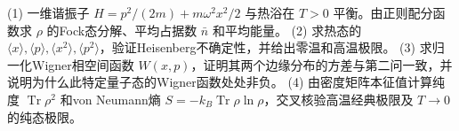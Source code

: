 (1) 一维谐振子 \(H=p^2/(2m)+m\omega^2x^2/2\) 与热浴在 \(T>0\) 平衡。由正则配分函数求 \(\rho\) 的Fock态分解、平均占据数 \(\bar n\) 和平均能量。
(2) 求热态的 \(\langle x\rangle,\langle p\rangle,\langle x^2\rangle,\langle p^2\rangle\)，验证Heisenberg不确定性，并给出零温和高温极限。
(3) 求归一化Wigner相空间函数 \(W(x,p)\)，证明其两个边缘分布的方差与第二问一致，并说明为什么此特定量子态的Wigner函数处处非负。
(4) 由密度矩阵本征值计算纯度 \(\operatorname{Tr}\rho^2\) 和von Neumann熵 \(S=-k_B\operatorname{Tr}\rho\ln\rho\)，交叉核验高温经典极限及 \(T\to0\) 的纯态极限。
